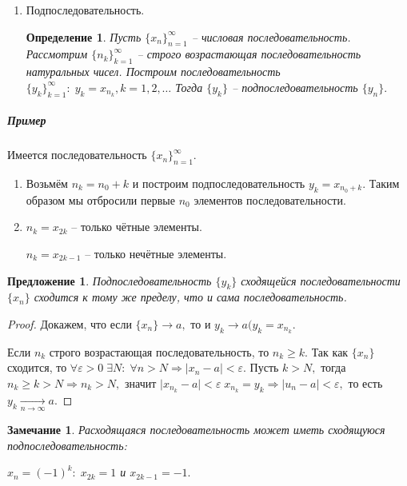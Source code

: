 \documentclass{article}
\newtheorem{Proposition}{Предложение}[section]
\newtheorem{Remark}{Замечание}[section]
\newtheorem{Definition}{Определение}[section]
\begin{document}
\begin{enumerate}
\begin{proof}
если $n>n_0,$ то $\mid x_n\mid<\mid a\mid+1\leq M.$
\end{proof}

Однако может случиться так, что последовательность ограничена и при этом расходится: $x_n=(-1)^{n}.$

\item Подпоследовательность.

\begin{Definition}
Пусть $\{x_n\}_{n=1}^{\infty}$ -- числовая последовательность. Рассмотрим $\{n_k\}_{k=1}^{\infty}$ -- строго возрастающая последовательность натуральных чисел. Построим последовательность $\{y_k\}_{k=1}^{\infty}: \; y_k=x_{n_k}, k=1, 2,\ldots$ Тогда $\{y_k\}$ -- подпоследовательность $\{y_n\}.$
\end{Definition}
\end{enumerate}

\subparagraph{Пример}
Имеется последовательность $\{x_n\}_{n=1}^{\infty}.$
\begin{enumerate}
\item Возьмём $n_k=n_0+k$ и построим подпоследовательность $y_k=x_{n_0+k}.$ Таким образом мы отбросили первые $n_0$ элементов последовательности.
\item $n_k=x_{2k}$ -- только чётные элементы.

$n_k=x_{2k-1}$ -- только нечётные элементы.
\end{enumerate}

\begin{Proposition}
Подпоследовательность $\{y_k\}$ сходящейся последовательности $\{x_n\}$ сходится к тому же пределу, что и сама последовательность.
\end{Proposition}
\begin{proof}
Докажем, что если $\{x_n\}\rightarrow a,$ то и $y_k\rightarrow a (y_k=x_{n_k}.$

Если $n_k$  строго возрастающая последовательность, то $n_k\geq k.$ Так как $\{x_n\}$ сходится, то $\forall\varepsilon>0 \; \exists N: \; \forall n>N \Rightarrow\mid x_n-a\mid<\varepsilon.$ Пусть $k>N,$ тогда $n_k\geq k>N \Rightarrow n_k>N,$ значит $\mid x_{n_k}-a\mid<\varepsilon \; x_{n_k}=y_k \Rightarrow \mid u_n-a\mid<\varepsilon,$ то есть $y_k \xrightarrow[n\rightarrow\infty]{} a.$
\end{proof}

\begin{Remark}
Расходящаяся последовательность может иметь сходящуюся подпоследовательность:

$x_n=(-1)^k: \; x_{2k}=1$ и $x_{2k-1}=-1.$
\end{Remark}
\end{document}
